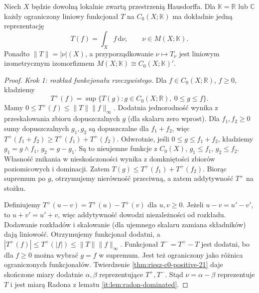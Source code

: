 \begin{twierdzenie}
\label{thm:riesz-complex-21}
Niech $X$ będzie dowolną lokalnie zwartą przestrzenią
Hausdorffa. Dla $\mathbb K=\mathbb R$ lub $\mathbb C$
każdy ograniczony liniowy funkcjonał $T$ na
$C_0(X;\mathbb K)$ ma dokładnie jedną reprezentację
\[
 T(f)=\int_X f\,\mathrm d\nu,\qquad
 \nu\in M(X;\mathbb K).
\]
Ponadto $\|T\|=|\nu|(X)$, a przyporządkowanie
$\nu\mapsto T_\nu$ jest liniowym izometrycznym
izomorfizmem $M(X;\mathbb K)\cong C_0(X;\mathbb K)'$.
\end{twierdzenie}
\begin{proof}
\emph{Krok 1: rozkład funkcjonału rzeczywistego.}
Dla $f\in C_0(X;\mathbb R)$, $f\ge0$, kładziemy
\[
 T^+(f)=\sup\{T(g):g\in C_0(X;\mathbb R),\ 0\le g\le f\}.
\]
Mamy $0\le T^+(f)\le\|T\|\|f\|_\infty$.
Dodatnia jednorodność wynika z przeskalowania zbioru
dopuszczalnych $g$ (dla skalaru zero wprost).
Dla $f_1,f_2\ge0$ sumy dopuszczalnych $g_1,g_2$
są dopuszczalne dla $f_1+f_2$, więc
$T^+(f_1+f_2)\ge T^+(f_1)+T^+(f_2)$.
Odwrotnie, jeśli $0\le g\le f_1+f_2$, kładziemy
$g_1=g\wedge f_1$, $g_2=g-g_1$. Są to nieujemne
funkcje z $C_0(X)$, $g_1\le f_1$, $g_2\le f_2$.
Własność znikania w nieskończoności wynika z
domkniętości zbiorów poziomicowych i dominacji.
Zatem $T(g)\le T^+(f_1)+T^+(f_2)$.
Biorąc supremum po $g$, otrzymujemy nierówność
przeciwną, a zatem addytywność $T^+$ na stożku.

Definiujemy $T^+(u-v)=T^+(u)-T^+(v)$ dla $u,v\ge0$.
Jeżeli $u-v=u'-v'$, to $u+v'=u'+v$, więc
addytywność dowodzi niezależności od rozkładu.
Dodawanie rozkładów i skalowanie (dla ujemnego
skalaru zamiana składników) dają liniowość.
Otrzymujemy funkcjonał dodatni, a
$|T^+(f)|\le T^+(|f|)\le\|T\|\|f\|_\infty$.
Funkcjonał $T^-=T^+-T$ jest dodatni, bo dla $f\ge0$
można wybrać $g=f$ w supremum. Jest też ograniczony
jako różnica ograniczonych funkcjonałów.
Twierdzenie \ref{thm:riesz-c0-positive-21} daje
skończone miary dodatnie $\alpha,\beta$ reprezentujące
$T^+,T^-$. Stąd $\nu=\alpha-\beta$ reprezentuje $T$
i jest miarą Radona z lematu \ref{it:lem:radon-dominated}.


\end{proof}
